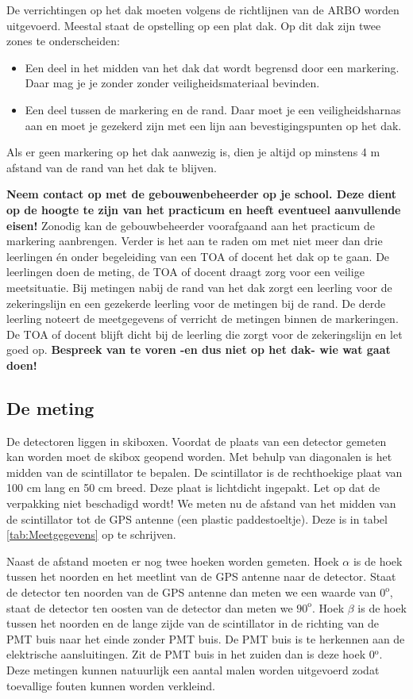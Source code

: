 De verrichtingen op het dak moeten volgens de richtlijnen van de ARBO worden uitgevoerd.
Meestal staat de opstelling op een plat dak. Op dit dak zijn twee zones
te onderscheiden:

\begin{itemize}
    \item Een deel in het midden van het dak dat wordt begrensd door een
          markering. Daar mag je je zonder zonder
          veiligheidsmateriaal bevinden.
    \item Een deel tussen de markering en de rand. Daar moet je
          een veiligheidsharnas aan en moet je gezekerd zijn met een lijn aan
          bevestigingspunten op het dak.
\end{itemize}
Als er geen markering op het dak aanwezig is, dien je altijd op minstens 4 m afstand van de rand van het dak te blijven.

\textbf{Neem contact op met de gebouwenbeheerder op je school. Deze
dient op de hoogte te zijn van het practicum en heeft eventueel
aanvullende eisen!} Zonodig kan de gebouwbeheerder voorafgaand aan het practicum de markering aanbrengen. 
Verder is het aan te raden om met niet meer dan drie
leerlingen \'en onder begeleiding van een TOA of docent het dak op te gaan.
De leerlingen doen de meting, de TOA of docent draagt zorg voor een
veilige meetsituatie. Bij metingen nabij de rand van het dak zorgt een leerling voor
de zekeringslijn en een gezekerde leerling voor de metingen bij de rand. De derde leerling noteert de meetgegevens of verricht de metingen binnen de markeringen. De TOA of docent blijft dicht bij de leerling die zorgt
voor de zekeringslijn en let goed op. \textbf{Bespreek van te voren -en
dus niet op het dak- wie wat gaat doen!}


\subsection{De meting}

De detectoren liggen in skiboxen. Voordat de plaats van een detector
gemeten kan worden moet de skibox geopend worden. Met behulp van
diagonalen is het midden van de scintillator te bepalen. De scintillator
is de rechthoekige plaat van 100 cm lang en 50 cm breed. Deze plaat is
lichtdicht ingepakt. Let op dat de verpakking niet beschadigd wordt! We
meten nu de afstand van het midden van de scintillator tot de GPS
antenne (een plastic paddestoeltje). Deze is in tabel
\ref{tab:Meetgegevens} op te schrijven.

Naast de afstand moeten er nog twee hoeken worden gemeten. Hoek $\alpha$
is de hoek tussen het noorden en het meetlint van de GPS antenne naar de
detector. Staat de detector ten noorden van de GPS antenne dan meten we
een waarde van $0^{\mathrm{o}}$, staat de detector ten oosten van de
detector dan meten we $90^{\mathrm{o}}$. Hoek $\beta$ is de hoek tussen
het noorden en de lange zijde van de scintillator in de richting van de
PMT buis naar het einde zonder PMT buis. De PMT buis is te herkennen aan
de elektrische aansluitingen. Zit de PMT buis in het zuiden dan is deze
hoek $0\mathrm{^{o}}$. Deze metingen kunnen natuurlijk een aantal malen
worden uitgevoerd zodat toevallige fouten kunnen worden verkleind.

